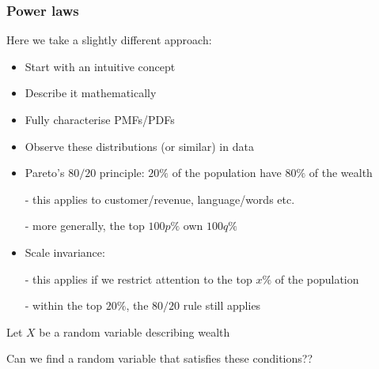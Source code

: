 \documentclass[t,8pt]{beamer}%
\begin{document}
\begin{frame}
	\frametitle{Power laws}
    Here we take a slightly different approach:
	\begin{itemize}
	    \item Start with an intuitive concept
            \item Describe it mathematically
            \item Fully characterise PMFs/PDFs
            \item Observe these distributions (or similar) in data
	\end{itemize}
    \begin{itemize}
        \item Pareto's $80/20$ principle: $20\%$ of the population have $80\%$ of the wealth \par
        {\small\color{NavyBlue} - this applies to customer/revenue, language/words etc.} \par
        {\small\color{NavyBlue} - more generally, the top $100p\%$ own $100q\%$} \par
        \item Scale invariance: \par
        - this applies if we restrict attention to the top $x\%$ of the population \par 
        {\small\color{NavyBlue} - within the top $20\%$, the $80/20$ rule still applies}
    \end{itemize}
        Let $X$ be a random variable describing wealth \par
        Can we find a random variable that satisfies these conditions??
\end{frame}
\end{document}
